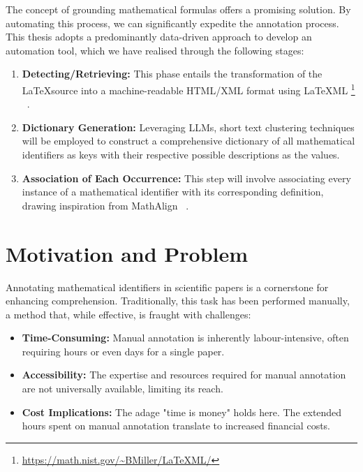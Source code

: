 The concept of grounding mathematical formulas \citep{asakura2020towards} offers a promising solution. By automating this process, we can significantly expedite the annotation process. This thesis adopts a predominantly data-driven approach to develop an automation tool, which we have realised through the following stages:

\begin{enumerate}
    \item \textbf{Detecting/Retrieving:} This phase entails the transformation of the \LaTeX \space source into a machine-readable HTML/XML format using \LaTeX ML \footnote{\url{https://math.nist.gov/~BMiller/LaTeXML/}} ~\citep{ginev2011latexml}.
    
    \item \textbf{Dictionary Generation:} Leveraging \ac{LLMs}, short text clustering techniques will be employed to construct a comprehensive dictionary of all mathematical identifiers as keys with their respective possible descriptions as the values.
    
    \item \textbf{Association of Each Occurrence:} This step will involve associating every instance of a mathematical identifier with its corresponding definition, drawing inspiration from MathAlign ~\citep{alexeeva2020mathalign}.
\end{enumerate}


\section{Motivation and Problem}

Annotating mathematical identifiers in scientific papers is a cornerstone for enhancing comprehension. Traditionally, this task has been performed manually, a method that, while effective, is fraught with challenges:

\begin{itemize}
    \item \textbf{Time-Consuming:} Manual annotation is inherently labour-intensive, often requiring hours or even days for a single paper.
    
    \item \textbf{Accessibility:} The expertise and resources required for manual annotation are not universally available, limiting its reach.
    
    \item \textbf{Cost Implications:} The adage "time is money" holds here. The extended hours spent on manual annotation translate to increased financial costs.
\end{itemize}

